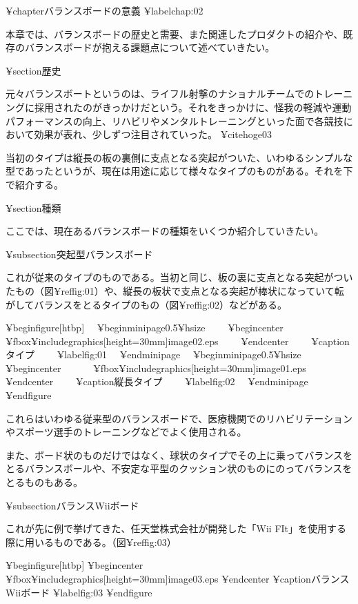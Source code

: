 ¥chapter{バランスボードの意義}
¥label{chap:02}

本章では、バランスボードの歴史と需要、また関連したプロダクトの紹介や、既存のバランスボードが抱える課題点について述べていきたい。


¥section{歴史}

元々バランスボートというのは、ライフル射撃のナショナルチームでのトレーニングに採用されたのがきっかけだという。それをきっかけに、怪我の軽減や運動パフォーマンスの向上、リハビリやメンタルトレーニングといった面で各競技において効果が表れ、少しずつ注目されていった。 ¥cite{hoge03}

当初のタイプは縦長の板の裏側に支点となる突起がついた、いわゆるシンプルな型であったというが、現在は用途に応じて様々なタイプのものがある。それを下で紹介する。


¥section{種類}

ここでは、現在あるバランスボードの種類をいくつか紹介していきたい。

¥subsection{突起型バランスボード}

これが従来のタイプのものである。当初と同じ、板の裏に支点となる突起がついたもの（図¥ref{fig:01}）や、縦長の板状で支点となる突起が棒状になっていて転がしてバランスをとるタイプのもの（図¥ref{fig:02}）などがある。



¥begin{figure}[htbp]
　¥begin{minipage}{0.5¥hsize}
　　¥begin{center}
　　　¥fbox{¥includegraphics[height=30mm]{image02.eps}}
　　¥end{center}
　　¥caption{タイプ}
　　¥label{fig:01}
　¥end{minipage}
　¥begin{minipage}{0.5¥hsize}
　　¥begin{center}
　　　¥fbox{¥includegraphics[height=30mm]{image01.eps}}
　　¥end{center}
　　¥caption{縦長タイプ}
　　¥label{fig:02}
　¥end{minipage}
¥end{figure}



これらはいわゆる従来型のバランスボードで、医療機関でのリハビリテーションやスポーツ選手のトレーニングなどでよく使用される。

また、ボード状のものだけではなく、球状のタイプでその上に乗ってバランスをとるバランスボールや、不安定な平型のクッション状のものにのってバランスをとるものもある。


¥subsection{バランスWiiボード}

これが先に例で挙げてきた、任天堂株式会社が開発した「Wii FIt」を使用する際に用いるものである。（図¥ref{fig:03}）


¥begin{figure}[htbp]
    ¥begin{center}
       ¥fbox{¥includegraphics[height=30mm]{image03.eps}}
    ¥end{center}
    ¥caption{バランスWiiボード}
    ¥label{fig:03}
¥end{figure}



